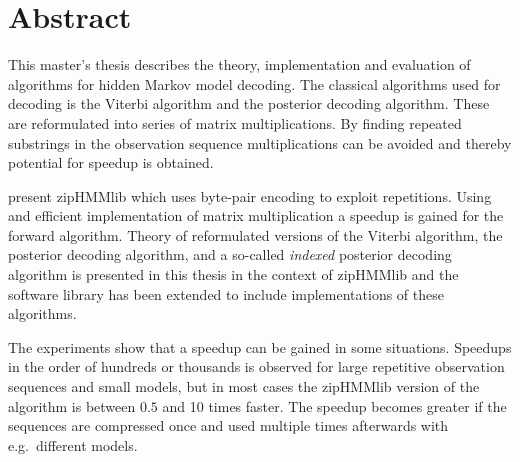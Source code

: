 \chapter*{Abstract}

This master's thesis describes the theory, implementation and evaluation of
algorithms for hidden Markov model decoding. The classical algorithms used
for decoding is the Viterbi algorithm and the posterior decoding algorithm.
These are reformulated into series of matrix multiplications. By finding
repeated substrings in the observation sequence multiplications can be
avoided and thereby potential for speedup is obtained.

\citet{sand2013ziphmmlib} present zipHMMlib which uses byte-pair encoding to
exploit repetitions. Using and efficient implementation of matrix
multiplication a speedup is gained for the forward algorithm. Theory of
reformulated versions of the Viterbi algorithm, the posterior decoding
algorithm, and a so-called \emph{indexed} posterior decoding algorithm is
presented in this thesis in the context of zipHMMlib and the software library
has been extended to include implementations of these algorithms.

The experiments show that a speedup can be gained in some situations. Speedups
in the order of hundreds or thousands is observed for large repetitive
observation sequences and small models, but in most cases the zipHMMlib version of
the algorithm is between $0.5$ and 10 times faster. The speedup becomes
greater if the sequences are compressed once and used multiple times afterwards
with e.g.\ different models.
